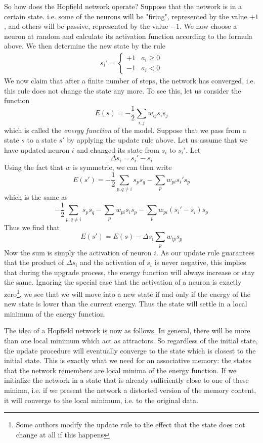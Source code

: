 \documentclass[a4paper, draft]{article}
\theoremstyle{own}
\theoremstyle{remark}
\begin{document}
So how does the Hopfield network operate? Suppose that the network is in a certain state. i.e. some of the neurons will be "firing", represented by the value $+1$, and others will be passive, represented by the value $-1$. We now choose a neuron at random and calculate its activation function according to the formula above. We then determine the new state by the rule
\begin{align}\label{eq:hopfieldupdaterule}
s_i' = 
\begin{cases} 
+1 & a_i \geq 0 \\
-1 & a_i < 0 
\end{cases}
\end{align}
We now claim that after a finite number of steps, the network has converged, i.e. this rule does not change the state any more. To see this, let us consider the function
$$
E(s) = - \frac{1}{2} \sum_{i,j} w_{ij} s_i s_j
$$
which is called the {\em energy function} of the model. Suppose that we pass from a state $s$ to a state $s'$ by applying the update rule above. Let us assume that we have updated neuron $i$ and changed its state from $s_i$ to $s_i'$. Let 
$$
\Delta s_i = s_i' - s_i
$$
Using the fact that $w$ is symmetric, we can then write
$$
E(s') = -\frac{1}{2} \sum_{p,q \neq i} s_p s_q - \sum_p w_{pi} s_i' s_p
$$
which is the same as
$$
-\frac{1}{2} \sum_{p,q \neq i} s_p s_q - \sum_p w_{pi} s_i s_p
- \sum_p w_{pi} (s_i' - s_i) s_p
$$
Thus we find that
$$
E(s') = E(s) - \Delta s_i \sum_p  w_{ip} s_p
$$
Now the sum is simply the activation of neuron $i$. As our update rule guarantees that the product of $\Delta s_i$ and the activation of $s_i$ is never negative, this implies that during the upgrade process, the energy function will always increase or stay the same. Ignoring the special case that the activation of a neuron is exactly zero\footnote{Some authors modify the update rule to the effect that the state does not change at all if this happens}, we see that we will move into a new state if and only if the energy of the new state is lower than the current energy. Thus the state will settle in a local minimum of the energy function. 

The idea of a Hopfield network is now as follows. In general, there will be more than one local minimum which act as attractors. So regardless of the initial state, the update procedure will eventually converge to the state which is closest to the initial state. This is exactly what we need for an associative memory: the states that the network remembers are local minima of the energy function. If we initialize the network in a state that is already sufficiently close to one of these minima, i.e. if we present the network a distorted version of the memory content, it will converge to the local minimum, i.e. to the original data.
\end{document}
